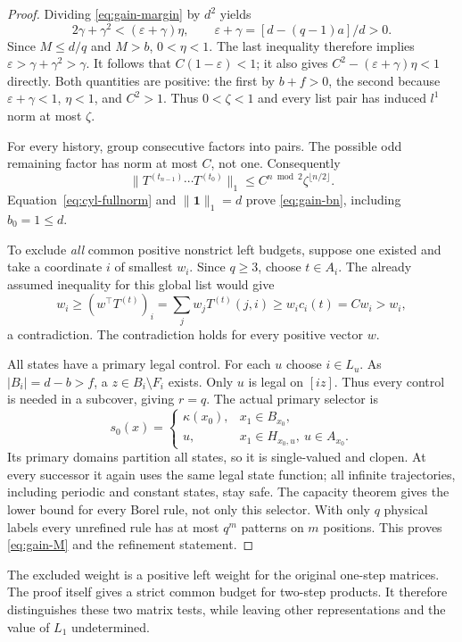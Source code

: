 \documentclass[11pt,reqno]{amsart}
\numberwithin{equation}{section}
\theoremstyle{definition}
\theoremstyle{definition}
\newcommand{\one}{\mathbf 1}
\newcommand{\eps}{\varepsilon}
\begin{document}
\begin{proof}
Dividing \eqref{eq:gain-margin} by $d^2$ yields
\[
 2\gamma+\gamma^2<(\eps+\gamma)\eta,
 \qquad\eps+\gamma=[d-(q-1)a]/d>0.
\]
Since $M\le d/q$ and $M>b$, $0<\eta<1$. The last inequality
therefore implies $\eps>\gamma+\gamma^2>\gamma$.
It follows that $C(1-\eps)<1$; it also gives
$C^2-(\eps+\gamma)\eta<1$ directly. Both quantities are positive:
the first by $b+f>0$, the second because
$\eps+\gamma<1$, $\eta<1$, and $C^2>1$.
Thus $0<\zeta<1$ and every list pair has induced $l^1$ norm
at most $\zeta$.

For every history, group consecutive factors into pairs. The possible
odd remaining factor has norm at most $C$, not one. Consequently
\[
 \|T^{(t_{n-1})}\cdots T^{(t_0)}\|_1
 \le C^{n\bmod2}\zeta^{\lfloor n/2\rfloor}.
\]
Equation~\eqref{eq:cyl-fullnorm} and $\|\one\|_1=d$ prove
\eqref{eq:gain-bn}, including $b_0=1\le d$.

To exclude \emph{all} common positive nonstrict left budgets,
suppose one existed and take a coordinate $i$ of smallest $w_i$.
Since $q\ge3$, choose $t\in A_i$. The already assumed
inequality for this global list would give
\[
 w_i\ge(w^\top T^{(t)})_i
 =\sum_jw_jT^{(t)}(j,i)\ge w_i c_i(t)=Cw_i>w_i,
\]
a contradiction. The contradiction holds for every positive vector $w$.

All states have a primary legal control. For each $u$ choose
$i\in L_u$. As $|B_i|=d-b>f$, a $z\in B_i\setminus F_i$
exists. Only $u$ is legal on $[iz]$. Thus every control is needed
in a subcover, giving $r=q$.
The actual primary selector is
\begin{equation}\label{eq:gain-selector}
 s_0(x)=\begin{cases}
 \kappa(x_0),&x_1\in B_{x_0},\\
 u,&x_1\in H_{x_0,u},\ u\in A_{x_0}.
 \end{cases}
\end{equation}
Its primary domains partition all states, so it is single-valued
and clopen. At every successor it again uses the same legal state
function; all infinite trajectories, including periodic and constant
states, stay safe. The capacity theorem gives the lower bound for
every Borel rule, not only this selector. With only $q$ physical
labels every unrefined rule has at most $q^m$ patterns on $m$
positions. This proves \eqref{eq:gain-M} and the refinement statement.
\end{proof}

The excluded weight is a positive left weight for the original
one-step matrices. The proof itself gives a strict common budget
for two-step products. It therefore distinguishes these two matrix
tests, while leaving other representations and the value of $L_1$
undetermined.
\end{document}
